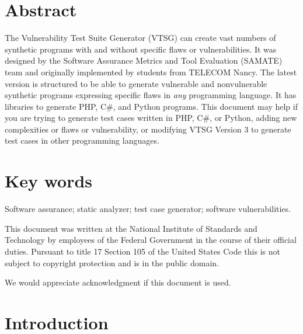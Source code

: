 \documentclass[12pt]{article}
\newcommand{\CSharp}{C{\fontseries{b}\selectfont\#}}
\begin{document}
\section*{Abstract}
\normalsize
The Vulnerability Test Suite Generator (VTSG) can create vast numbers of
synthetic programs with and without specific flaws or vulnerabilities.
It was designed by the Software Assurance Metrics and Tool Evaluation (SAMATE) team
and originally implemented by students from TELECOM Nancy.
The latest version is structured to be able to generate vulnerable and nonvulnerable
synthetic programs expressing specific flaws in \emph{any} programming language.
It has libraries to generate PHP, \CSharp, and Python programs.
This document may help if you are trying to generate test cases written in 
PHP, \CSharp, or Python, adding new complexities or flaws or vulnerability, or
modifying VTSG Version 3 to generate test
cases in other programming languages.

\section*{Key words}
\normalsize Software assurance; static analyzer; test case generator; 
software vulnerabilities.

\vfill

This document was written at the National Institute of Standards and
Technology by employees of the Federal Government in the course of
their official duties.  Pursuant to title 17 Section 105 of the United
States Code this is not subject to copyright protection and
is in the public domain.


We would appreciate acknowledgment if this document is used.

\pagebreak
\begin{center}
\tableofcontents
\listoftables
\listoffigures
\end{center}
\pagebreak

\newpage

\section{Introduction}
\end{document}
